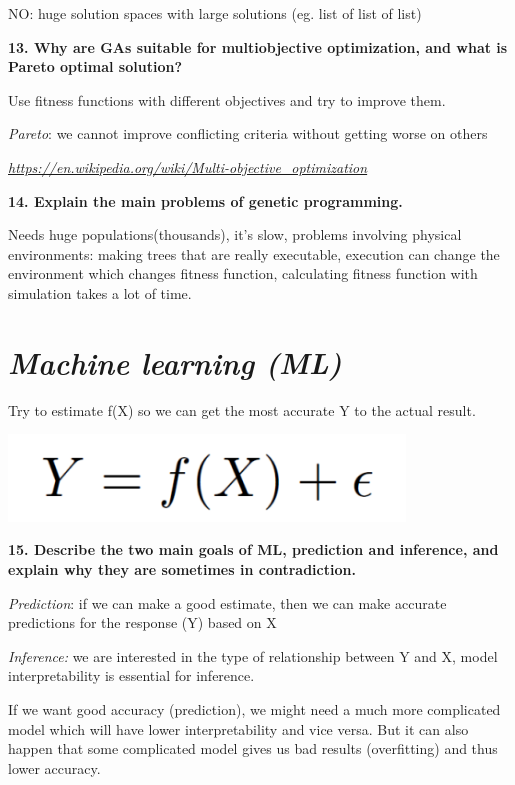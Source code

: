 NO: huge solution spaces with large solutions (eg. list of list of list)

\textbf{13. Why are GAs suitable for multiobjective optimization, and
what is Pareto optimal solution?}

Use fitness functions with different objectives and try to improve them.

\textit{Pareto}: we cannot improve conflicting criteria without
getting worse on others

\href{https://en.wikipedia.org/wiki/Multi-objective_optimization}{\textit{https://en.wikipedia.org/wiki/Multi-objective\_optimization}}

\textbf{14. Explain the main problems of genetic programming.}

Needs huge populations(thousands), it's slow, problems involving
physical environments: making trees that are really executable,
execution can change the environment which changes fitness function,
calculating fitness function with simulation takes a lot of time.

\hypertarget{machine-learning-ml}{%
\section{\texorpdfstring{\textit{Machine learning
(ML)}}{Machine learning (ML)}}\label{machine-learning-ml}}

Try to estimate f(X) so we can get the most accurate Y to the actual
result.

\includegraphics[width=4.15104in,height=0.91284in]{media/image5.png}

\textbf{15. Describe the two main goals of ML, prediction and inference,
and explain why they are sometimes in contradiction.}

\textit{Prediction}: if we can make a good estimate, then we can make
accurate predictions for the response (Y) based on X

\textit{Inference:} we are interested in the type of relationship
between Y and X, model interpretability is essential for inference.

If we want good accuracy (prediction), we might need a much more
complicated model which will have lower interpretability and vice versa.
But it can also happen that some complicated model gives us bad results
(overfitting) and thus lower accuracy.

